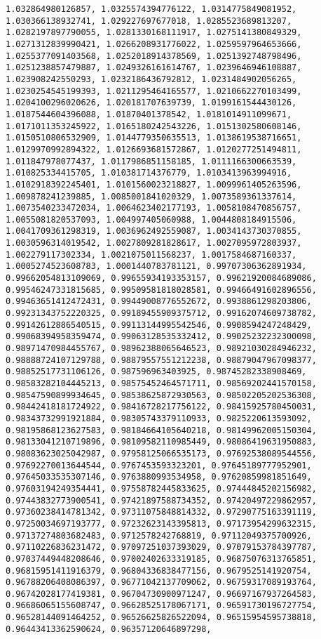 \documentclass[11pt]{article}
\begin{document}
\begin{Verbatim}[commandchars=\\\{\}]
1.032864980126857, 1.0325574394776122, 1.0314775849081952, 1.030366138932741, 1.029227697677018, 1.0285523689813207, 1.0282197897790055, 1.0281330168111917, 1.0275141380849329, 1.0271312839990421, 1.0266208931776022, 1.0259597964653666, 1.0255377091403568, 1.0252018914378569, 1.0251392748798496, 1.0251238857479887, 1.0249326161614767, 1.0239646946108887, 1.023908242550293, 1.0232186436792812, 1.0231484902056265, 1.0230254545199393, 1.0211295464165577, 1.0210662270103499, 1.0204100296020626, 1.020181707639739, 1.0199161544430126, 1.0187544604396088, 1.01870401378542, 1.0181014911099671, 1.0171011353245922, 1.0165180242543226, 1.0151302580608146, 1.0150510806532909, 1.0144779350635513, 1.0138619538716651, 1.0129970992894322, 1.0126693681572867, 1.0120277251494811, 1.011847978077437, 1.0117986851158185, 1.0111166300663539, 1.010825334415705, 1.010381714376779, 1.0103413963994916, 1.0102918392245401, 1.0101560023218827, 1.0099961405263596, 1.009878241239885, 1.0085001841020329, 1.0073589361337614, 1.0073540233472034, 1.0064623402177193, 1.0058108470856757, 1.0055081820537093, 1.004997405060988, 1.0044808184915506, 1.0041709361298319, 1.0036962492559087, 1.0034143730370855, 1.0030596314019542, 1.0027809281828617, 1.0027095972803937, 1.002279117302334, 1.0021075011568237, 1.0017584687160337, 1.0005274523608783, 1.0001440783781121, 0.99707306362891934, 0.99662054813109069, 0.99655934193353157, 0.99621920084689086, 0.99546247331815685, 0.99509581818028581, 0.99466491602896556, 0.99463651412472431, 0.99449008776552672, 0.9938861298203806, 0.99231343752220325, 0.99189455909375712, 0.99162074609738782, 0.99142612886540515, 0.99113144995542546, 0.9908594247248429, 0.99068394958359474, 0.99063128535332412, 0.99025232232300098, 0.98971470984455767, 0.98962388065646523, 0.98921030284946232, 0.98888724107129788, 0.98879557551212238, 0.98879047967098377, 0.98852517731106126, 0.987596963403925, 0.98745282338908469, 0.98583282104445213, 0.98575452464571711, 0.98569202441570158, 0.98547590899934645, 0.98538625872930563, 0.98502205202536308, 0.98442418181724922, 0.98416728217756122, 0.98415925780450031, 0.98343732991921884, 0.98305743379110933, 0.9825220613593092, 0.98195868123627583, 0.98184664105640218, 0.98149962005150304, 0.98133041210719896, 0.98109582110985449, 0.98086419631950883, 0.98083623025042987, 0.97958125066535173, 0.97692538089544556, 0.97692270013644544, 0.9767453593323201, 0.97645189777952901, 0.97645033535307146, 0.9763880993534958, 0.97620859981851649, 0.97603194249354441, 0.97558782445833625, 0.97444845202156982, 0.97443832773900541, 0.97421897588734352, 0.97420497229862957, 0.97360238414781342, 0.97311075848814332, 0.97290775163391119, 0.97250034697193777, 0.97232623143395813, 0.97173954299632315, 0.97137274803682483, 0.9712578242768819, 0.97112049375700926, 0.97110226836231472, 0.97097251037393029, 0.97079153784397787, 0.97037449448208646, 0.97002402633319185, 0.96875076313765851, 0.96815951411916379, 0.96804336838477156, 0.9679525141920754, 0.96788206408086397, 0.96771042137709062, 0.96759317089193764, 0.96742028177419381, 0.96704730900971247, 0.96697167937264583, 0.96686065155608747, 0.96628525178067171, 0.96591730196727754, 0.96528144091464252, 0.96526625826522094, 0.96515954595738818, 0.96443413362590624, 0.96357120646897298, 
\end{Verbatim}
\end{document}
